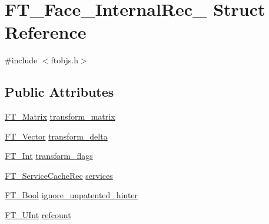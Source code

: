 \hypertarget{struct_f_t___face___internal_rec__}{\section{F\-T\-\_\-\-Face\-\_\-\-Internal\-Rec\-\_\- Struct Reference}
\label{struct_f_t___face___internal_rec__}
}


{\ttfamily \#include $<$ftobjs.\-h$>$}

\subsection*{Public Attributes}
\begin{DoxyCompactItemize}
\item 
\hyperlink{fttypes_8h_afeacbc4365cf2ad77162b6292f3e3e23}{F\-T\-\_\-\-Matrix} \hyperlink{struct_f_t___face___internal_rec___ab4be2dcda098e6136f5701580d18032d}{transform\-\_\-matrix}
\item 
\hyperlink{ftimage_8h_ab158b5a7e422acb1968af95db786d018}{F\-T\-\_\-\-Vector} \hyperlink{struct_f_t___face___internal_rec___ab6c2aacdac58312273395b21b8d168c6}{transform\-\_\-delta}
\item 
\hyperlink{fttypes_8h_af90e5fb0d07e21be9fe6faa33f02484c}{F\-T\-\_\-\-Int} \hyperlink{struct_f_t___face___internal_rec___a2495aced35040e1b7c2bc0afcd7a920d}{transform\-\_\-flags}
\item 
\hyperlink{ftserv_8h_a17b5dbf7cdd804df38826e4f0536fbfb}{F\-T\-\_\-\-Service\-Cache\-Rec} \hyperlink{struct_f_t___face___internal_rec___abc3acb3bf5db056bb9c549af04f07963}{services}
\item 
\hyperlink{fttypes_8h_a1a832a256bb5a7e6e884afaa1a07f3ae}{F\-T\-\_\-\-Bool} \hyperlink{struct_f_t___face___internal_rec___af898fd754c36c3f34c9ce0e88eb101c9}{ignore\-\_\-unpatented\-\_\-hinter}
\item 
\hyperlink{fttypes_8h_abcb8db4dbf35d2b55a9e8c7b0926dc52}{F\-T\-\_\-\-U\-Int} \hyperlink{struct_f_t___face___internal_rec___a05d49c857c024a50441e17899803f56c}{refcount}
\end{DoxyCompactItemize}



